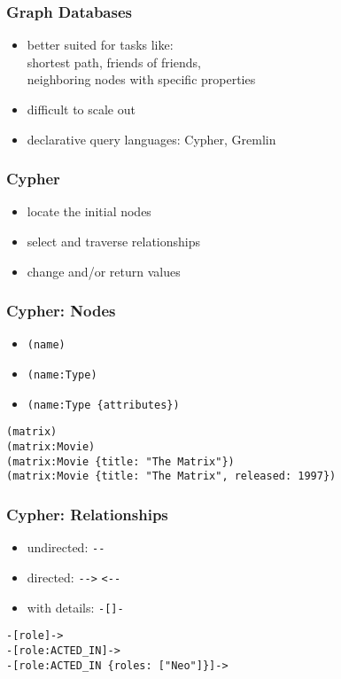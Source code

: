 \documentclass[dvipsnames]{beamer}
\theoremstyle{plain}
\begin{document}
\begin{frame}
  \frametitle{Graph Databases}

  \begin{itemize}
    \item better suited for tasks like:\\
      shortest path, friends of friends,\\
      neighboring nodes with specific properties

    \pause
    \medskip
    \item difficult to scale out

    \pause
    \bigskip
    \item declarative query languages: Cypher, Gremlin
  \end{itemize}
\end{frame}

\begin{frame}
  \frametitle{Cypher}

  \begin{itemize}
    \item locate the initial nodes
    \item select and traverse relationships
    \item change and/or return values
  \end{itemize}
\end{frame}

\begin{frame}[fragile]
  \frametitle{Cypher: Nodes}

  \begin{itemize}
    \item \lstinline|(name)|
    \item \lstinline|(name:Type)|
    \item \lstinline|(name:Type {attributes})|
  \end{itemize}

  \begin{lstlisting}
(matrix)
(matrix:Movie)
(matrix:Movie {title: "The Matrix"})
(matrix:Movie {title: "The Matrix", released: 1997})
  \end{lstlisting}
\end{frame}

\begin{frame}[fragile]
  \frametitle{Cypher: Relationships}

  \begin{itemize}
    \item undirected: \lstinline|--|
    \item directed: \lstinline|-->| \lstinline|<--|
    \item with details: \lstinline|-[]-|
  \end{itemize}

  \begin{lstlisting}
-[role]->
-[role:ACTED_IN]->
-[role:ACTED_IN {roles: ["Neo"]}]->
  \end{lstlisting}
\end{frame}
\end{document}
